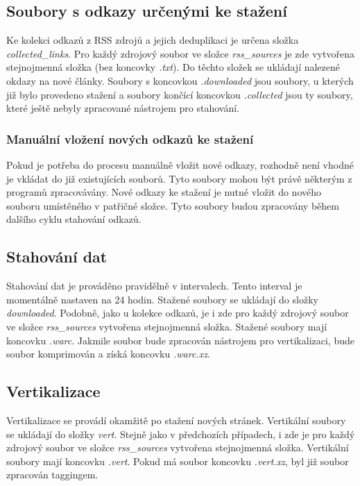 \subsection{Soubory s odkazy určenými ke stažení}
Ke kolekci odkazů z RSS zdrojů a jejich deduplikaci je určena složka \textit{collected\_links}.
Pro každý zdrojový soubor ve složce \textit{rss\_sources} je zde vytvořena stejnojmenná složka (bez koncovky \textit{.txt}).
Do těchto složek se ukládají nalezené okdazy na nové články. Soubory s koncovkou \textit{.downloaded}
jsou soubory, u kterých již bylo provedeno stažení a soubory končící koncovkou \textit{.collected}
jsou ty soubory, které ještě nebyly zpracované nástrojem pro stahování.

\subsubsection{Manuální vložení nových odkazů ke stažení}
Pokud je potřeba do procesu manuálně vložit nové odkazy, rozhodně není vhodné
je vkládat do již existujících souborů. Tyto soubory mohou být právě některým z programů
zpracovávány. Nové odkazy ke stažení je nutné vložit do nového souboru
umístěného v patřičné složce. Tyto soubory budou zpracovány během dalšího cyklu stahování
odkazů.

\subsection{Stahování dat}
Stahování dat je prováděno pravidělně v intervalech. Tento interval je momentálně
nastaven na 24 hodin. Stažené soubory se ukládají do složky \textit{downloaded}.
Podobně, jako u kolekce odkazů, je i zde pro každý zdrojový soubor ve složce \textit{rss\_sources}
vytvořena stejnojmenná složka. Stažené soubory mají koncovku \textit{.warc}. Jakmile
soubor bude zpracován nástrojem pro vertikalizaci, bude soubor komprimován a získá
koncovku \textit{.warc.xz}.

\subsection{Vertikalizace}
Vertikalizace se provádí okamžitě po stažení nových stránek. Vertikální soubory se ukládají
do složky \textit{vert}. Stejně jako v předchozích případech, i zde je
pro každý zdrojový soubor ve složce \textit{rss\_sources} vytvořena stejnojmenná složka.
Vertikální soubory mají koncovku \textit{.vert}. Pokud má soubor koncovku \textit{.vert.xz},
byl již soubor zpracován taggingem.

